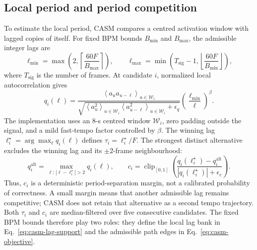 \documentclass{article}
\begin{document}
\subsection{Local period and period competition}
To estimate the local period, CASM compares a centred activation window with lagged copies of itself. For fixed BPM bounds $B_{\min}$ and $B_{\max}$, the admissible integer lags are
\begin{equation}
\ell_{\min}=\max\!\left(2,\left\lceil\frac{60F}{B_{\max}}\right\rceil\right),\qquad
\ell_{\max}=\min\!\left(T_{\mathrm{sig}}-1,\left\lfloor\frac{60F}{B_{\min}}\right\rfloor\right),
\label{eq:casm-lag-support}
\end{equation}
where $T_{\mathrm{sig}}$ is the number of frames. At candidate $i$, normalized local autocorrelation gives
\begin{equation}
q_i(\ell)=
\frac{\left\langle a_u a_{u-\ell}\right\rangle_{u\in\mathcal W_i}}
{\sqrt{\left\langle a_u^2\right\rangle_{u\in\mathcal W_i}
\left\langle a_{u-\ell}^2\right\rangle_{u\in\mathcal W_i}+\epsilon_q}}
\left(\frac{\ell_{\min}}{\ell}\right)^{\beta}.
\label{eq:casm-local-period}
\end{equation}
The implementation uses an 8-s centred window $\mathcal W_i$, zero padding outside the signal, and a mild fast-tempo factor controlled by $\beta$. The winning lag $\ell_i^\star=\arg\max_\ell q_i(\ell)$ defines $\tau_i=\ell_i^\star/F$. The strongest distinct alternative excludes the winning lag and its $\pm2$-frame neighbourhood:
\begin{equation}
q_i^{\mathrm{alt}}=\max_{\ell:\,|\ell-\ell_i^\star|>2}q_i(\ell),\qquad
c_i=\operatorname{clip}_{[0,1]}\!\left(
\frac{q_i(\ell_i^\star)-q_i^{\mathrm{alt}}}
{|q_i(\ell_i^\star)|+\epsilon_c}\right).
\label{eq:casm-reliability}
\end{equation}
Thus, $c_i$ is a deterministic period-separation margin, not a calibrated probability of correctness. A small margin means that another admissible lag remains competitive; CASM does not retain that alternative as a second tempo trajectory. Both $\tau_i$ and $c_i$ are median-filtered over five consecutive candidates. The fixed BPM bounds therefore play two roles: they define the local lag bank in Eq.~\eqref{eq:casm-lag-support} and the admissible path edges in Eq.~\eqref{eq:casm-objective}.
\end{document}
